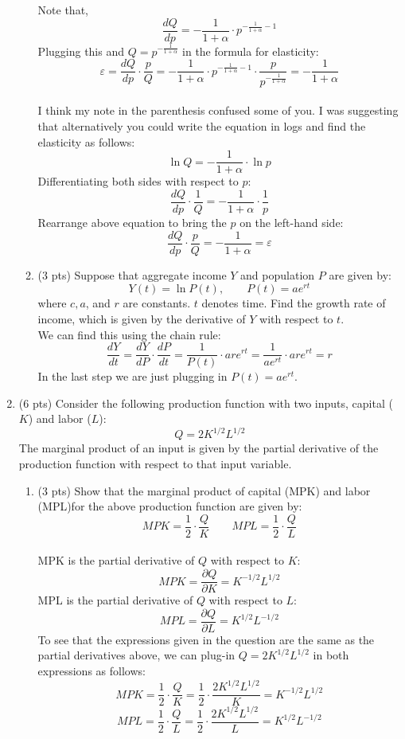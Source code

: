 \documentclass{./../../../Latex/tests}
\begin{document}
\begin{enumerate}
\begin{enumerate}
Note that,
$$ \frac{dQ}{dp} = -\frac{1}{1+\alpha}\cdot p^{-\frac{1}{1+\alpha}-1}$$
Plugging this and $Q = p^{-\frac{1}{1+\alpha}}$ in the formula for elasticity:
$$ \varepsilon = \frac{dQ}{dp}\cdot \frac{p}{Q} = -\frac{1}{1+\alpha}\cdot p^{-\frac{1}{1+\alpha}-1} \cdot \frac{p}{p^{-\frac{1}{1+\alpha}}} = -\frac{1}{1+\alpha}  $$ \\

I think my note in the parenthesis confused some of you. I was suggesting that alternatively you could write the equation in logs and find the elasticity as follows:
$$\ln Q = -\frac{1}{1+\alpha} \cdot \ln p$$
Differentiating both sides with respect to $p$:
$$ \frac{dQ}{dp}\cdot\frac{1}{Q} = -\frac{1}{1+\alpha} \cdot \frac{1}{p}  $$
Rearrange above equation to bring the $p$ on the left-hand side:
$$ \frac{dQ}{dp}\cdot\frac{p}{Q} = -\frac{1}{1+\alpha} =\varepsilon  $$

\newpage
\item (3 pts) Suppose that aggregate income $Y$ and population $P$ are given by:
$$Y(t) = \ln P(t), \quad \quad P(t) = ae^{rt}$$ 
where $c, a$, and $r$ are constants. $t$ denotes time. Find the growth rate of income, which is given by the derivative of $Y$ with respect to $t$. \\

We can find this using the chain rule:
$$ \frac{dY}{dt} =  \frac{dY}{dP} \cdot \frac{dP}{dt} = \frac{1}{P(t)}\cdot are^{rt}= \frac{1}{ae^{rt}}\cdot are^{rt} = r $$
In the last step we are just plugging in $P(t) = ae^{rt}$.
\end{enumerate}

\newpage
\item (6 pts) Consider the following production function with two inputs, capital ($K$) and labor ($L$):
$$ Q = 2K^{1/2}L^{1/2} $$
The marginal product of an input is given by the partial derivative of the production function with respect to that input variable. 
\begin{enumerate}
\item (3 pts) Show that the marginal product of capital (MPK) and labor (MPL)for the above production function are given by:
$$ MPK = \frac{1}{2}\cdot\frac{Q}{K} \quad \quad MPL = \frac{1}{2}\cdot \frac{Q}{L} $$ \\
MPK is the partial derivative of $Q$ with respect to $K$:
$$ MPK = \frac{\partial Q}{\partial K} = K^{-1/2} L^{1/2}  $$
MPL is the partial derivative of $Q$ with respect to $L$:
$$ MPL = \frac{\partial Q}{\partial L} = K^{1/2} L^{-1/2} $$
To see that the expressions given in the question are the same as the partial derivatives above, we can plug-in $Q=2K^{1/2}L^{1/2}$ in both expressions as follows:
$$ MPK = \frac{1}{2}\cdot\frac{Q}{K}=  \frac{1}{2}\cdot\frac{2K^{1/2}L^{1/2}}{K} =  K^{-1/2} L^{1/2} $$
$$ MPL = \frac{1}{2}\cdot\frac{Q}{L} = \frac{1}{2}\cdot\frac{2K^{1/2}L^{1/2}}{L} =  K^{1/2} L^{-1/2} $$ \\


\end{enumerate}
\end{enumerate}
\end{document}
